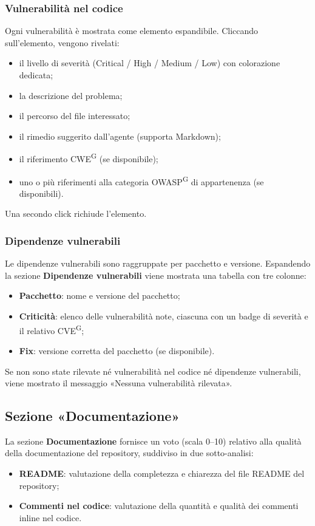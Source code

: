 \documentclass[a4paper, 11pt]{article}
\begin{document}
\subsubsection{Vulnerabilità nel codice}
Ogni vulnerabilità è mostrata come elemento espandibile. Cliccando sull'elemento, vengono rivelati:
\begin{itemize}
    \item il livello di severità (Critical / High / Medium / Low) con colorazione dedicata;
    \item la descrizione del problema;
    \item il percorso del file interessato;
    \item il rimedio suggerito dall'agente (supporta Markdown);
    \item il riferimento CWE\textsuperscript{G} (se disponibile);
    \item uno o più riferimenti alla categoria OWASP\textsuperscript{G} di appartenenza (se disponibili).
\end{itemize}

Una secondo click richiude l'elemento.

\subsubsection{Dipendenze vulnerabili}
Le dipendenze vulnerabili sono raggruppate per pacchetto e versione. Espandendo la sezione \textbf{Dipendenze vulnerabili} viene mostrata una tabella con tre colonne:
\begin{itemize}
    \item \textbf{Pacchetto}: nome e versione del pacchetto;
    \item \textbf{Criticità}: elenco delle vulnerabilità note, ciascuna con un badge di severità e il relativo CVE\textsuperscript{G};
    \item \textbf{Fix}: versione corretta del pacchetto (se disponibile).
\end{itemize}

\noindent Se non sono state rilevate né vulnerabilità nel codice né dipendenze vulnerabili, viene mostrato il messaggio «Nessuna vulnerabilità rilevata».

\subsection{Sezione «Documentazione»}
La sezione \textbf{Documentazione} fornisce un voto (scala 0--10) relativo alla qualità della documentazione del repository, suddiviso in due sotto-analisi:
\begin{itemize}
    \item \textbf{README}: valutazione della completezza e chiarezza del file README del repository;
    \item \textbf{Commenti nel codice}: valutazione della quantità e qualità dei commenti inline nel codice.
\end{itemize}
\end{document}
